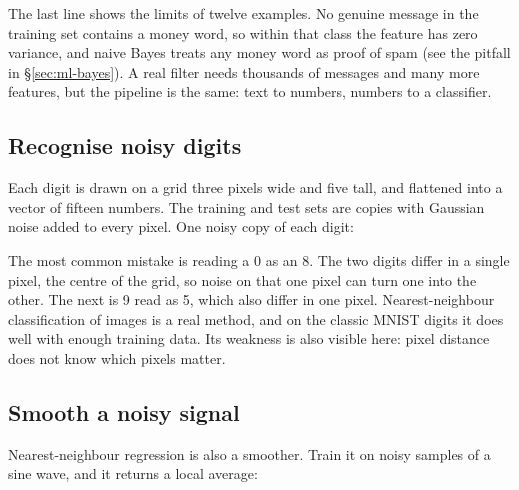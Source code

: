 The last line shows the limits of twelve examples. No genuine message in the
training set contains a money word, so within that class the feature has zero
variance, and naive Bayes treats any money word as proof of spam (see the pitfall
in \S\ref{sec:ml-bayes}). A real filter needs thousands of messages and many
more features, but the pipeline is the same: text to numbers, numbers to a
classifier.

\subsection*{Recognise noisy digits}

Each digit is drawn on a grid three pixels wide and five tall, and flattened into
a vector of fifteen numbers. The training and test sets are copies with Gaussian
noise added to every pixel. One noisy copy of each digit:


\begin{codepairs}
\end{codepairs}

The most common mistake is reading a 0 as an 8. The two digits differ in a single
pixel, the centre of the grid, so noise on that one pixel can turn one into the
other. The next is 9 read as 5, which also differ in one pixel. Nearest-neighbour
classification of images is a real method, and on the classic MNIST digits it does
well with enough training data. Its weakness is also visible here: pixel
distance does not know which pixels matter.

\subsection*{Smooth a noisy signal}

Nearest-neighbour regression is also a smoother. Train it on noisy samples of a
sine wave, and it returns a local average:



